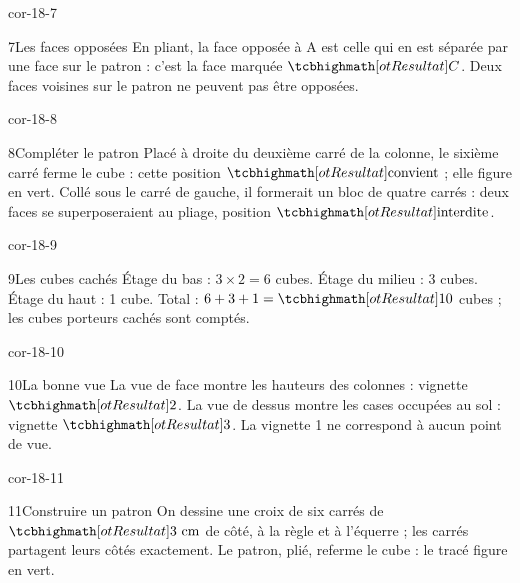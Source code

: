 \begin{blocLivre}{cor-18-7}\begin{corrige}{7}{Les faces opposées}
En pliant, la face opposée à A est celle qui en est séparée par une face sur le patron : c’est la face marquée $\res C$. Deux faces voisines sur le patron ne peuvent pas être opposées.
\label{fig-cor-18-7}
\end{corrige}\end{blocLivre}
\begin{blocLivre}{cor-18-8}\begin{corrige}{8}{Compléter le patron}
Placé à droite du deuxième carré de la colonne, le sixième carré ferme le cube : cette position $\res{\text{convient}}$ ; elle figure en vert. Collé sous le carré de gauche, il formerait un bloc de quatre carrés : deux faces se superposeraient au pliage, position $\res{\text{interdite}}$.
\label{fig-cor-18-8}
\end{corrige}\end{blocLivre}
\begin{blocLivre}{cor-18-9}\begin{corrige}{9}{Les cubes cachés}
Étage du bas : $3\times2=6$ cubes. Étage du milieu : 3 cubes. Étage du haut : 1 cube. Total : $6+3+1=\res{10}$ cubes ; les cubes porteurs cachés sont comptés.
\label{fig-cor-18-9}
\end{corrige}\end{blocLivre}
\begin{blocLivre}{cor-18-10}\begin{corrige}{10}{La bonne vue}
La vue de face montre les hauteurs des colonnes : vignette $\res2$. La vue de dessus montre les cases occupées au sol : vignette $\res3$. La vignette 1 ne correspond à aucun point de vue.
\label{fig-cor-18-10}
\end{corrige}\end{blocLivre}
\begin{blocLivre}{cor-18-11}\begin{corrige}{11}{Construire un patron}
On dessine une croix de six carrés de $\res{3\ \mathrm{cm}}$ de côté, à la règle et à l’équerre ; les carrés partagent leurs côtés exactement. Le patron, plié, referme le cube : le tracé figure en vert.
\label{fig-cor-18-11}
\end{corrige}\end{blocLivre}
